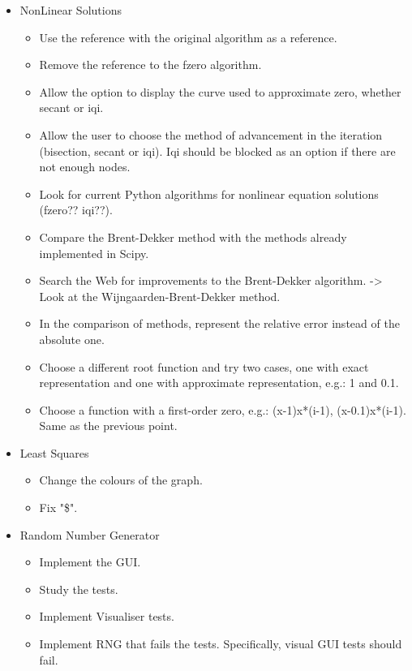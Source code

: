 \begin{itemize}
\item NonLinear Solutions
\begin{itemize}
    \item Use the reference with the original algorithm as a reference.
    \item Remove the reference to the fzero algorithm.
    \item Allow the option to display the curve used to approximate zero, whether secant or iqi.
    \item Allow the user to choose the method of advancement in the iteration (bisection, secant or iqi). Iqi should be blocked as an option if there are not enough nodes.
    \item Look for current Python algorithms for nonlinear equation solutions (fzero?? iqi??).
    \item Compare the Brent-Dekker method with the methods already implemented in Scipy.
    \item Search the Web for improvements to the Brent-Dekker algorithm. -> Look at the Wijngaarden-Brent-Dekker method.
    \item In the comparison of methods, represent the relative error instead of the absolute one.
    \item Choose a different root function and try two cases, one with exact representation and one with approximate representation, e.g.: 1 and 0.1.
    \item Choose a function with a first-order zero, e.g.: (x-1)x*(i-1), (x-0.1)x*(i-1). Same as the previous point.
\end{itemize}

\item Least Squares
\begin{itemize}
    \item Change the colours of the graph.
    \item Fix "\$".
\end{itemize}

\item Random Number Generator
\begin{itemize}
    \item Implement the GUI.
    \item Study the tests.
    \item Implement Visualiser tests.
    \item Implement RNG that fails the tests. Specifically, visual GUI tests should fail.
\end{itemize}
\end{itemize}